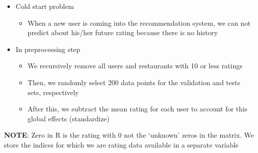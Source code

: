 \documentclass[11pt]{article}
\providecommand{\tightlist}{%
      \setlength{\itemsep}{0pt}\setlength{\parskip}{0pt}}
\begin{document}
\begin{itemize}
\tightlist
\item
  Cold start problem

  \begin{itemize}
  \tightlist
  \item
    When a new user is coming into the recommendation system, we can not
    predict about his/her future rating because there is no history
  \end{itemize}
\item
  In preprocessing step

  \begin{itemize}
  \tightlist
  \item
    We recursively remove all users and restaurants with 10 or less
    ratings
  \item
    Then, we randomly select 200 data points for the validation and
    tests sets, respectively
  \item
    After this, we subtract the mean rating for each user to account for
    this global effects (standardize)
  \end{itemize}
\end{itemize}

\textbf{NOTE}: Zero in R is the rating with 0 not the `unknown' zeros in
the matrix. We store the indices for which we are rating data available
in a separate variable
\end{document}
